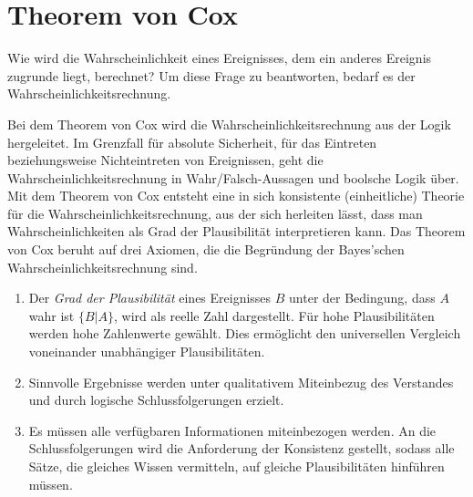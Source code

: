 \section{Theorem von Cox}
Wie wird die Wahrscheinlichkeit eines Ereignisses, dem ein anderes Ereignis zugrunde liegt, berechnet? Um diese Frage zu beantworten, bedarf es der Wahrscheinlichkeitsrechnung.

Bei dem Theorem von Cox wird die Wahrscheinlichkeitsrechnung aus der Logik hergeleitet.
Im Grenzfall für absolute Sicherheit, für das Eintreten beziehungsweise Nichteintreten von Ereignissen, geht die Wahrscheinlichkeitsrechnung in Wahr/Falsch-Aussagen und boolsche Logik über.
Mit dem Theorem von Cox entsteht eine in sich konsistente (einheitliche) Theorie für die Wahrscheinlichkeitsrechnung, aus der sich herleiten lässt, dass man Wahrscheinlichkeiten als Grad der Plausibilität interpretieren kann.
Das Theorem von Cox beruht auf drei Axiomen, die die Begründung der Bayes'schen Wahrscheinlichkeitsrechnung sind.


\begin{enumerate}
 \item Der \emph{Grad der Plausibilität} eines Ereignisses $B$ unter der Bedingung, dass $A$ wahr ist $\{B|A\}$, wird als reelle Zahl dargestellt.
       Für hohe Plausibilitäten werden hohe Zahlenwerte gewählt.
       Dies ermöglicht den universellen Vergleich voneinander unabhängiger Plausibilitäten.
 \item Sinnvolle Ergebnisse werden unter qualitativem Miteinbezug des Verstandes und durch logische Schlussfolgerungen erzielt.
 \item Es müssen alle verfügbaren Informationen miteinbezogen werden.
	   An die Schlussfolgerungen wird die Anforderung der Konsistenz gestellt, sodass alle Sätze, die gleiches Wissen vermitteln, auf gleiche Plausibilitäten hinführen müssen.
\end{enumerate}

